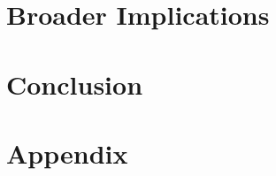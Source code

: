 \documentclass[sigconf, nonacm]{acmart}
\begin{document}
\section{Broader Implications}\label{sec:broad}


\section{Conclusion}\label{sec:conclusion}





\newpage
\section*{Appendix}

\end{document}
